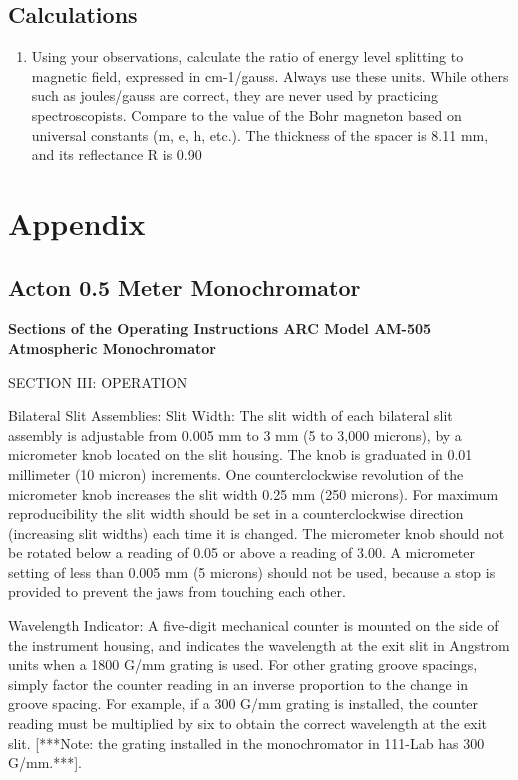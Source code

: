 \documentclass{../lab}
\begin{document}
\subsection{Calculations}

\begin{enumerate}
    \item Using your observations, calculate the ratio of energy level splitting to magnetic field, expressed in cm-1/gauss. Always use these units. While others such as joules/gauss are correct, they are never used by practicing spectroscopists. Compare to the value of the Bohr magneton based on universal constants (m, e, h, etc.). The thickness of the spacer is 8.11 mm, and its reflectance R is 0.90
\end{enumerate}

\section{Appendix}
\label{sec:Appendix}

\subsection{Acton 0.5 Meter Monochromator}

\textbf{Sections of the Operating Instructions ARC Model AM-505 Atmospheric Monochromator}

SECTION III: OPERATION

Bilateral Slit Assemblies: Slit Width: The slit width of each bilateral slit assembly is adjustable from 0.005 mm to 3 mm (5 to 3,000 microns), by a micrometer knob located on the slit housing. The knob is graduated in 0.01 millimeter (10 micron) increments. One counterclockwise revolution of the micrometer knob increases the slit width 0.25 mm (250 microns). For maximum reproducibility the slit width should be set in a counterclockwise direction (increasing slit widths) each time it is changed. The micrometer knob should not be rotated below a reading of 0.05 or above a reading of 3.00. A micrometer setting of less than 0.005 mm (5 microns) should not be used, because a stop is provided to prevent the jaws from touching each other.

Wavelength Indicator: A five-digit mechanical counter is mounted on the side of the instrument housing, and indicates the wavelength at the exit slit in Angstrom units when a 1800 G/mm grating is used. For other grating groove spacings, simply factor the counter reading in an inverse proportion to the change in groove spacing. For example, if a 300 G/mm grating is installed, the counter reading must be multiplied by six to obtain the correct wavelength at the exit slit. [***Note: the grating installed in the monochromator in 111-Lab has 300 G/mm.***].
\end{document}
